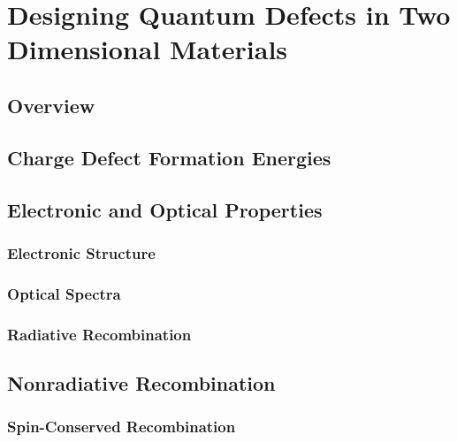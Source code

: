 \chapter{Designing Quantum Defects in Two Dimensional Materials}

\section{Overview}

\section{Charge Defect Formation Energies}

\section{Electronic and Optical Properties}

\subsection{Electronic Structure}

\subsection{Optical Spectra}

\subsection{Radiative Recombination}

\section{Nonradiative Recombination}

\subsection{Spin-Conserved Recombination}

